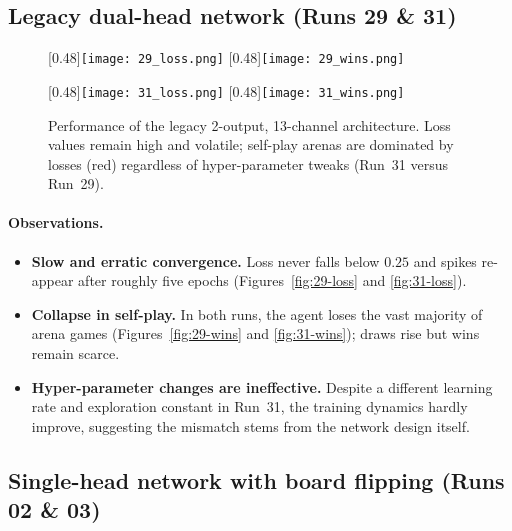 \documentclass{report}
\begin{document}
\subsection{Legacy dual-head network (Runs 29 \& 31)}

\begin{figure}[htbp]
  \centering
    [0.48\linewidth]{\texttt{[image: 29\_loss.png]}}
  \hfill
    [0.48\linewidth]{\texttt{[image: 29\_wins.png]}}

  \vspace{1em}

    [0.48\linewidth]{\texttt{[image: 31\_loss.png]}}
  \hfill
    [0.48\linewidth]{\texttt{[image: 31\_wins.png]}}
  \caption{Performance of the legacy 2-output, 13-channel architecture.  
           Loss values remain high and volatile; self-play arenas are dominated
           by losses (red) regardless of hyper-parameter tweaks
           (Run~31 versus Run~29).}
  \label{fig:legacy}
\end{figure}

\paragraph{Observations.}
\begin{itemize}
  \item \textbf{Slow and erratic convergence.}  
        Loss never falls below $0.25$ and spikes re-appear after roughly five
        epochs (Figures~\ref{fig:29-loss} and \ref{fig:31-loss}).
  \item \textbf{Collapse in self-play.}  
        In both runs, the agent loses the vast majority of arena games
        (Figures~\ref{fig:29-wins} and \ref{fig:31-wins}); draws rise but wins
        remain scarce.
  \item \textbf{Hyper-parameter changes are ineffective.}  
        Despite a different learning rate and exploration constant in
        Run~31, the training dynamics hardly improve, suggesting the mismatch
        stems from the network design itself.
\end{itemize}

\subsection{Single-head network with board flipping (Runs 02 \& 03)}
\end{document}
